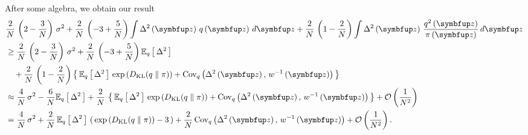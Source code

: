 \begin{proofEnd}
After some algebra, we obtain our result
\begin{align*}
  &\frac{2}{N} \,
  \left(2 - \frac{3}{N}\right)
  \, \sigma^2
  +
  \frac{2}{N} \,
  \left(-3 + \frac{5}{N}\right) 
  \int
  \Delta^2\left(\vz\right) \,
  q\left(\vz\right)\,d\vz
  +
  \frac{2}{N} \,
  \left(1 - \frac{2}{N}\right)
  \int
  \Delta^2\left(\vz\right) \,
  \frac{q^2\left(\vz\right)}{\pi\left(\vz\right)}\,
  d\vz
  \\
  &\geq
    \frac{2}{N} \,
    \left(2 - \frac{3}{N}\right)
  \, \sigma^2
  +
  \frac{2}{N} \,
  \left(-3 + \frac{5}{N}\right) 
  \Esub{q}{
    \Delta^2 
  }\nonumber
  \\
  &\quad+
  \frac{2}{N} \,
  \left(1 - \frac{2}{N}\right)
  \left\{\,
  \Esub{q}{
    \Delta^2
  }
  \,
  \exp\left(
    \DKL{q}{\pi}
  \right)
  +
  \text{Cov}_{q}\left(\Delta^2\left(\vz\right),\, w^{-1}\left(\vz\right)\right)
  \,\right\}
  \\
  &\approx
  \frac{4}{N} \, \sigma^2
  -
  \frac{6}{N}
  \Esub{q}{
    \Delta^2 
  }
  +
  \frac{2}{N} \,
  \left\{\,
  \Esub{q}{
    \Delta^2
  }
  \,
  \exp\left(
    \DKL{q}{\pi}
  \right)
  +
  \text{Cov}_{q}\left(\Delta^2\left(\vz\right),\, w^{-1}\left(\vz\right)\right)
  \,\right\}
  +
  \mathcal{O}\left(\frac{1}{N^2}\right)
  \\
  &=
  \frac{4}{N} \, \sigma^2
  +
  \frac{2}{N} \,
  \Esub{q}{
    \Delta^2 
  }
  \,
  \left(\,
  \exp\left(
    \DKL{q}{\pi}
  \right)
  -
  3
  \,\right)
  +
  \frac{2}{N} \,
  \text{Cov}_{q}\left(\Delta^2\left(\vz\right),\, w^{-1}\left(\vz\right)\right)
  +
  \mathcal{O}\left(\frac{1}{N^2}\right).
\end{align*}


\end{proofEnd}
